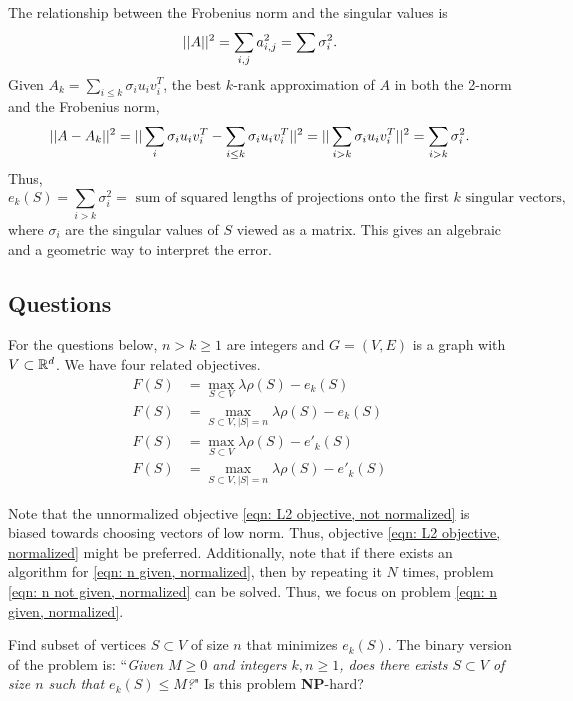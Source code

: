 \documentclass{article}
\begin{document}
The relationship between the Frobenius norm and the singular values is
$$||A||^2 = \sum_{i,j}a_{i,j}^2 = \sum \sigma_i^2.$$
Given $A_k = \sum_{i\leq k}\sigma_i u_i v_i^T$, the best $k$-rank approximation of $A$ in both the 2-norm and the Frobenius norm,
$$||A - A_k||^2 = ||\sum_{i}\sigma_i u_i v_i^T - \sum_{i\leq k}\sigma_i u_i v_i^T||^2 = ||\sum_{i > k}\sigma_i u_i v_i^T||^2 = \sum_{i>k}\sigma_i^2.$$
Thus, $$e_k(S) = \sum_{i>k}\sigma_i^2 = \text{ sum of squared lengths of projections onto the first $k$ singular vectors},$$ where $\sigma_i$ are the singular values of $S$ viewed as a matrix. This gives an algebraic and a geometric way to interpret the error.

\subsection{Questions}
For the questions below, $n > k \geq 1$ are integers and $G = (V,E)$ is a graph with $V\subset \mathbb{R}^d$. We have four related objectives.
\begin{align}
    F(S) &= \max_{S \subset V} \lambda \rho(S) - e_k(S)\label{eqn: n not given, not normalized}\\
    F(S) &= \max_{S \subset V, |S| = n} \lambda \rho(S) - e_k(S)\label{eqn: n given, not normalized}\\
    F(S) &= \max_{S \subset V} \lambda \rho(S) - e'_k(S)\label{eqn: n not given, normalized}\\
    F(S) &= \max_{S \subset V, |S| = n} \lambda \rho(S) - e'_k(S)\label{eqn: n given, normalized}
\end{align}

Note that the unnormalized objective \ref{eqn: L2 objective, not normalized} is biased towards choosing vectors of low norm. Thus, objective \ref{eqn: L2 objective, normalized} might be preferred.
 Additionally, note that if there exists an algorithm for \ref{eqn: n given, normalized}, then by repeating it $N$ times, problem \ref{eqn: n not given, normalized} can be solved. Thus, we focus on problem \ref{eqn: n given, normalized}.

\begin{question}\label{problem: no density}
    Find subset of vertices $S\subset V$ of size $n$ that minimizes $e_k(S)$. The binary version of the problem is: ``\textit{Given $M \geq 0$ and integers $k,n\geq 1$, does there exists  $S\subset V$ of size $n$ such that $e_k(S)\leq M$?}" Is this problem \textbf{NP}-hard?
\end{question}
\end{document}
